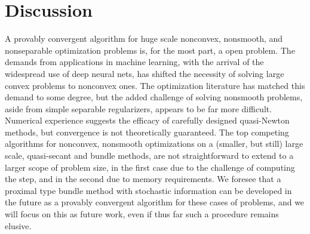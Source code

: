\documentclass[psamsfonts,onesided,10pt]{amsart}
\theoremstyle{definition}
\theoremstyle{remark}
\numberwithin{equation}{section}
\begin{document}
\section{Discussion}
A provably convergent algorithm for huge scale nonconvex, nonsmooth, and nonseparable optimization problems
is, for the most part, a open problem. The demands from applications in machine learning, with the arrival
of the widespread use of deep neural nets, has shifted the necessity of solving large convex problems
to nonconvex ones. The optimization literature has matched this demand to some degree, but the added
challenge of solving nonsmooth problems, aside from simple separable regularizers, appears to be far more
difficult. Numerical experience suggests the efficacy of carefully designed quasi-Newton methods,
but convergence is not theoretically guaranteed. The top competing algorithms for nonconvex, nonsmooth
optimizations on a (smaller, but still) large scale, quasi-secant and bundle methods, are not straightforward
to extend to a larger scope of problem size, in the first case due to the challenge of computing the 
step, and in the second due to memory requirements. We foresee that a proximal type bundle method with 
stochastic information can be developed in the future as a provably convergent algorithm for these
cases of problems, and we will focus on this as future work, even if thus far such a procedure 
remains elusive.







\end{document}
